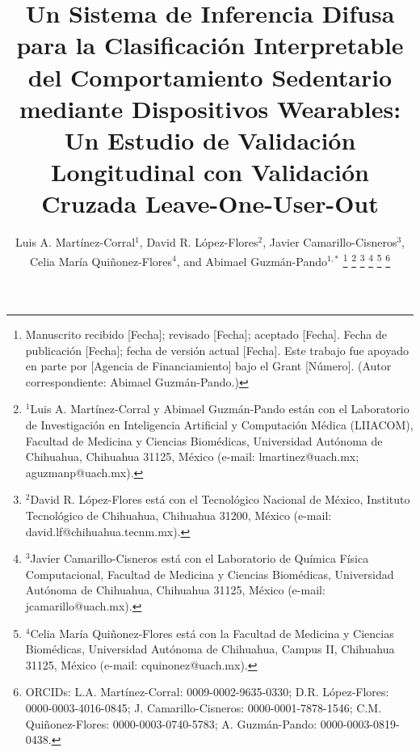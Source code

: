 \documentclass[journal,twoside,web]{ieeecolor}
\begin{document}
\title{Un Sistema de Inferencia Difusa para la Clasificación Interpretable del Comportamiento Sedentario mediante Dispositivos Wearables: Un Estudio de Validación Longitudinal con Validación Cruzada Leave-One-User-Out}

\author{Luis A. Martínez-Corral$^{1}$, 
David R. López-Flores$^{2}$, 
Javier Camarillo-Cisneros$^{3}$, 
Celia María Quiñonez-Flores$^{4}$, 
and Abimael Guzmán-Pando$^{1,*}$
\thanks{Manuscrito recibido [Fecha]; revisado [Fecha]; aceptado [Fecha]. Fecha de publicación [Fecha]; fecha de versión actual [Fecha]. Este trabajo fue apoyado en parte por [Agencia de Financiamiento] bajo el Grant [Número]. (Autor correspondiente: Abimael Guzmán-Pando.)}
\thanks{$^{1}$Luis A. Martínez-Corral y Abimael Guzmán-Pando están con el Laboratorio de Investigación en Inteligencia Artificial y Computación Médica (LIIACOM), Facultad de Medicina y Ciencias Biomédicas, Universidad Autónoma de Chihuahua, Chihuahua 31125, México (e-mail: lmartinez@uach.mx; aguzmanp@uach.mx).}
\thanks{$^{2}$David R. López-Flores está con el Tecnológico Nacional de México, Instituto Tecnológico de Chihuahua, Chihuahua 31200, México (e-mail: david.lf@chihuahua.tecnm.mx).}
\thanks{$^{3}$Javier Camarillo-Cisneros está con el Laboratorio de Química Física Computacional, Facultad de Medicina y Ciencias Biomédicas, Universidad Autónoma de Chihuahua, Chihuahua 31125, México (e-mail: jcamarillo@uach.mx).}
\thanks{$^{4}$Celia María Quiñonez-Flores está con la Facultad de Medicina y Ciencias Biomédicas, Universidad Autónoma de Chihuahua, Campus II, Chihuahua 31125, México (e-mail: cquinonez@uach.mx).}
\thanks{ORCIDs: L.A. Martínez-Corral: 0009-0002-9635-0330; D.R. López-Flores: 0000-0003-4016-0845; J. Camarillo-Cisneros: 0000-0001-7878-1546; C.M. Quiñonez-Flores: 0000-0003-0740-5783; A. Guzmán-Pando: 0000-0003-0819-0438.}}

\maketitle
\end{document}
